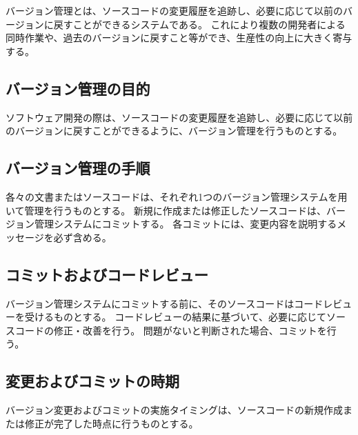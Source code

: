 \clearpage
バージョン管理とは、ソースコードの変更履歴を追跡し、必要に応じて以前のバージョンに戻すことができるシステムである。
これにより複数の開発者による同時作業や、過去のバージョンに戻すこと等ができ、生産性の向上に大きく寄与する。

\subsection{バージョン管理の目的}
ソフトウェア開発の際は、ソースコードの変更履歴を追跡し、必要に応じて以前のバージョンに戻すことができるように、バージョン管理を行うものとする。

\subsection{バージョン管理の手順}
各々の文書またはソースコードは、それぞれ1つのバージョン管理システムを用いて管理を行うものとする。
新規に作成または修正したソースコードは、バージョン管理システムにコミットする。
各コミットには、変更内容を説明するメッセージを必ず含める。

\subsection{コミットおよびコードレビュー}
バージョン管理システムにコミットする前に、そのソースコードはコードレビューを受けるものとする。
コードレビューの結果に基づいて、必要に応じてソースコードの修正・改善を行う。
問題がないと判断された場合、コミットを行う。

\subsection{変更およびコミットの時期}
バージョン変更およびコミットの実施タイミングは、ソースコードの新規作成または修正が完了した時点に行うものとする。


